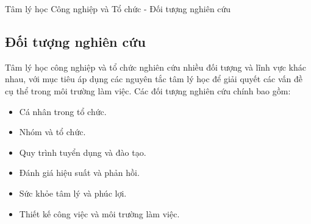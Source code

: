 \documentclass[../main.tex]{subfiles}
\begin{document}
\begin{frame}{Tâm lý học Công nghiệp và Tổ chức - Đối tượng nghiên cứu}
\subsection{Đối tượng nghiên cứu}
Tâm lý học công nghiệp và tổ chức nghiên cứu nhiều đối tượng và lĩnh vực khác nhau, với mục tiêu áp dụng các nguyên tắc tâm lý học để giải quyết các vấn đề cụ thể trong môi trường làm việc. Các đối tượng nghiên cứu chính bao gồm:
\begin{itemize}
    \item Cá nhân trong tổ chức.
    \item Nhóm và tổ chức.
    \item Quy trình tuyển dụng và đào tạo.
    \item Đánh giá hiệu suất và phản hồi.
    \item Sức khỏe tâm lý và phúc lợi.
    \item Thiết kế công việc và môi trường làm việc.


\end{itemize}

\end{frame}
\end{document}

